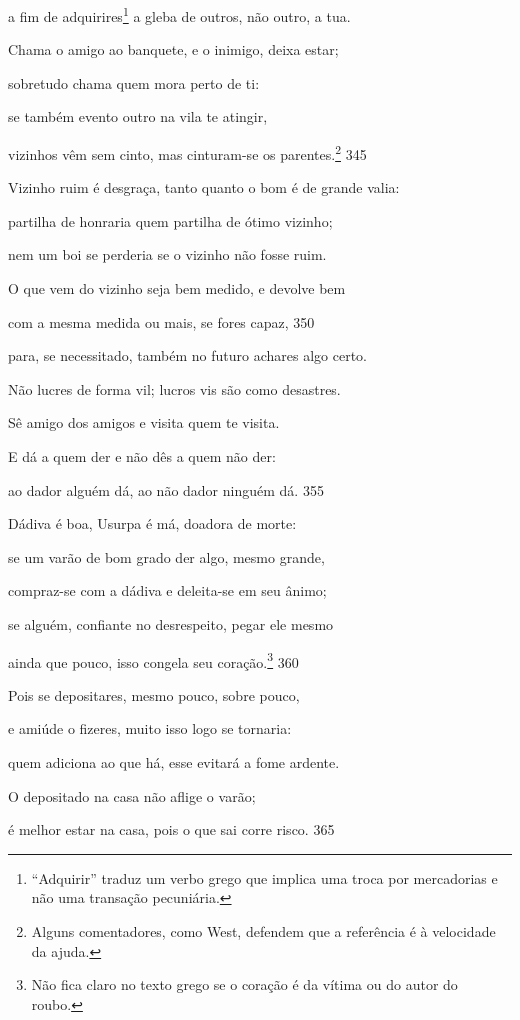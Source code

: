 a fim de adquirires\footnote{``Adquirir'' traduz um verbo grego que implica uma troca por mercadorias e não uma transação pecuniária.} a gleba de outros, não outro, a tua.

Chama o amigo ao banquete, e o inimigo, deixa estar;

sobretudo chama quem mora perto de ti:

se também evento outro na vila te atingir,

vizinhos vêm sem cinto, mas cinturam-se os parentes.\footnote{Alguns comentadores, como West, defendem que a referência é à
velocidade da ajuda.} \num{345}

Vizinho ruim é desgraça, tanto quanto o bom é de grande valia:

partilha de honraria quem partilha de ótimo vizinho;

nem um boi se perderia se o vizinho não fosse ruim.

O que vem do vizinho seja bem medido, e devolve bem

com a mesma medida ou mais, se fores capaz, \num{350}

para, se necessitado, também no futuro achares algo certo.

Não lucres de forma vil; lucros vis são como desastres.

Sê amigo dos amigos e visita quem te visita.

E dá a quem der e não dês a quem não der:

ao dador alguém dá, ao não dador ninguém dá. \num{355}

Dádiva é boa, Usurpa é má, doadora de morte:

se um varão de bom grado der algo, mesmo grande,

compraz-se com a dádiva e deleita-se em seu ânimo;

se alguém, confiante no desrespeito, pegar ele mesmo

ainda que pouco, isso congela seu coração.\footnote{Não fica claro no texto grego se o coração é da vítima ou do autor do roubo.} \num{360}

Pois se depositares, mesmo pouco, sobre pouco,

e amiúde o fizeres, muito isso logo se tornaria:

quem adiciona ao que há, esse evitará a fome ardente.

O depositado na casa não aflige o varão;

é melhor estar na casa, pois o que sai corre risco. \num{365}

